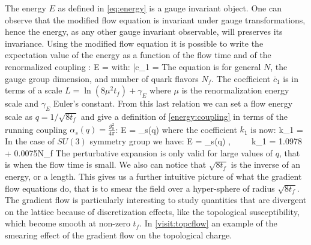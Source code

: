 The energy $E$ as defined in \cref{eq:energy} is a gauge invariant object. One can observe that the modified flow equation is invariant under gauge transformations, hence the energy, as any other gauge invariant observable, will preserves its invariance. 
Using the modified flow equation it is possible to write the expectation value of the energy as a function of the flow time and of the renormalized coupling \cite{luscher_properties_2010}:
\beq
    \langle E \rangle = 
    \label{energy:coupling}
\eeq
with:
\beq
    \bar c_1 =   
\eeq
The equation is for general $N$, the gauge group dimension, and number of quark flavors $N_f$. The coefficient $\bar c_1$ is in terms of a scale $L=\ln(8\mu^2t_f) + \gamma_E$ where $\mu$ is the renormalization energy scale and $\gamma_E$ Euler's constant. From this last relation we can set a flow energy scale as $q=1/\sqrt{8t_f}$ and give a definition of \cref{energy:coupling} in terms of the running coupling $\alpha_s(q) = \frac{g_0^2}{4\pi}$:
\beq
    \langle E \rangle =  \alpha_s(q) 
\eeq
where the coefficient $k_1$ is now:
\beq
   k_1 =   
\eeq
In the case of $SU(3)$ symmetry group we have:
\beq
    \langle E \rangle =  \alpha_s(q) ,~~~~~k_1 = 1.0978 + 0.0075\times N_f
    \label{energy_flow}
\eeq
The perturbative expansion is only valid for large values of $q$, that is when the flow time is small. We also can notice that $\sqrt{8t_f}$ is the inverse of an energy, or a length. This gives us a further intuitive picture of what the gradient flow equations do, that is to smear the field over a hyper-sphere of radius $\sqrt{8t_f}$. The gradient flow is particularly interesting to study quantities that are divergent on the lattice because of discretization effects, like the topological susceptibility, which become smooth at non-zero $t_f$. In \cref{visit:topcflow} an example of the smearing effect of the gradient flow on the topological charge. 
